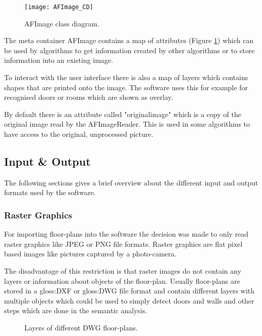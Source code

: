 \begin{figure}[h]
  \centering
      \texttt{[image: AFImage\_CD]}
  \caption{AFImage class diagram.}
  \label{fig:AFImage_CD}
\end{figure}

The meta container AFImage contains a map of attributes (Figure \ref{fig:AFImage_CD}) which can be used by algorithms to get information created by other algorithms or to store information into an existing image.

To interact with the user interface there is also a map of layers which contains shapes that are printed onto the image. The software uses this for example for recognised doors or rooms which are shown as overlay.

By default there is an attribute called "originalimage" which is a copy of the original image read by the AFImageReader. This is used in some algorithms to have access to the original, unprocessed picture.

\pagebreak

\subsection{Input \& Output}
The following sections gives a brief overview about the different input and output formats used by the software.

\subsubsection{Raster Graphics}
For importing floor-plans into the software the decision was made to only read raster graphics like JPEG or PNG file formats. Raster graphics are flat pixel based images like pictures captured by a photo-camera.

The disadvantage of this restriction is that raster images do not contain any layers or information about objects of the floor-plan. Usually floor-plans are stored in a \gls{gloss:DXF} or \gls{gloss:DWG} file format and contain different layers with multiple objects which could be used to simply detect doors and walls and other steps which are done in the semantic analysis.

\begin{figure}[h]
	\centering
	\hfill
	\hfill
	\caption{Layers of different DWG floor-plans. }
	\label{fig:layer_comparison}
\end{figure}

